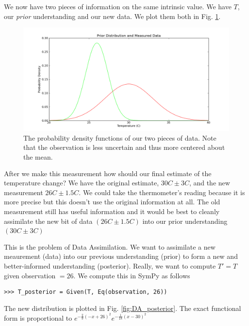 We now have two pieces of information on the same intrinsic value. We have $T$, our \textit{prior} understanding and our new data. We plot them both in Fig. \ref{fig:DA_data}. 

\begin{figure}[ht]
\vspace{-0pt}
\centering
\includegraphics[width=.7\textwidth]{images/data.png}
\vspace{-0pt}
\caption{The probability density functions of our two pieces of data. Note that the observation is less uncertain and thus more centered about the mean.}
\label{fig:DA_data}
\vspace{00pt}
\end{figure}

After we make this measurement how should our final estimate of the temperature change? We have the original estimate, $30C \pm 3C$, and the new measurement $26C \pm 1.5C$. We could take the thermometer’s reading because it is more precise but this doesn’t use the original information at all. The old measurement still has useful information and it would be best to cleanly assimilate the new bit of data $(26C \pm 1.5C)$ into our prior understanding $(30C \pm 3C)$

This is the problem of Data Assimilation. We want to assimilate a new meaurement (data) into our previous understanding (prior) to form a new and better-informed understanding (posterior). Really, we want to compute $T' = T$ given observation $= 26$. We compute this in SymPy as follows

\begin{lstlisting}
>>> T_posterior = Given(T, Eq(observation, 26))
\end{lstlisting}

The new distribution is plotted in Fig. \ref{fig:DA_posterior}. The exact functional form is proportional to $e^{-\frac{2}{9} \left(-x + 26\right)^{2}} e^{-\frac{1}{18} \left(x-30\right)^{2}}$ 

